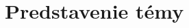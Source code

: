 \documentclass[report.tex]{subfiles}
\begin{document}
	
\section{Predstavenie témy}	
	
	
\end{document}
